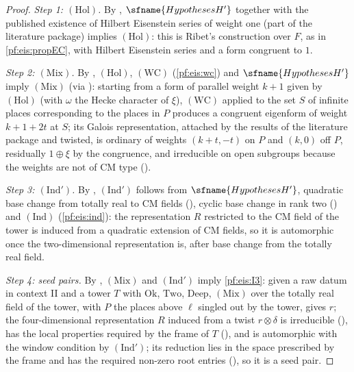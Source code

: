 \begin{proof}
\emph{Step 1: $(\mathrm{Hol})$.} By , $\sfname{HypothesesH'}$ together with the published existence
of Hilbert Eisenstein series of weight one (part of the literature package) implies $(\mathrm{Hol})$: this is Ribet's construction over $F$, as in
\cref{pf:eis:propEC}, with Hilbert Eisenstein series and a form congruent to $1$.

\emph{Step 2: $(\mathrm{Mix})$.} By , $(\mathrm{Hol})$, $(\mathrm{WC})$ (\cref{pf:eis:wc}) and
$\sfname{HypothesesH'}$ imply $(\mathrm{Mix})$ (via ): starting from a form of parallel weight
$k+1$ given by $(\mathrm{Hol})$ (with $\omega$ the Hecke character of $\xi$), $(\mathrm{WC})$ applied to the set $S$ of infinite places corresponding to
the places in $P$ produces a congruent eigenform of weight $k+1+2t$ at $S$; its Galois representation, attached by the results of the
literature package and twisted, is ordinary of weights $(k+t,-t)$ on $P$ and $(k,0)$ off $P$, residually $1\oplus\xi$ by the congruence, and
irreducible on open subgroups because the weights are not of CM type ().

\emph{Step 3: $(\mathrm{Ind}')$.} By ,
$(\mathrm{Ind}')$ follows from $\sfname{HypothesesH'}$, quadratic base change from totally real to CM fields
(), cyclic base change in rank two () and
$(\mathrm{Ind})$ (\cref{pf:eis:ind}): the representation $R$ restricted to the CM field of the tower is induced from a quadratic extension of CM
fields, so it is automorphic once the two-dimensional representation is, after base change from the totally real field.

\emph{Step 4: seed pairs.} By , $(\mathrm{Mix})$ and $(\mathrm{Ind}')$ imply \ref{pf:eis:I3}: given a raw datum
in context II and a tower $T$ with $\mathrm{Ok}$, $\mathrm{Two}$, $\mathrm{Deep}$, $(\mathrm{Mix})$ over the totally real field of the tower, with $P$ the places
above $\ell$ singled out by the tower, gives $r$; the four-dimensional representation $R$ induced from a twist $r\otimes\delta$ is irreducible
(), has the local properties required by the frame of $T$
(), and is automorphic with the window condition by $(\mathrm{Ind}')$; its reduction lies in the space
prescribed by the frame and has the required non-zero root entries (), so it is a seed
pair.
\end{proof}

